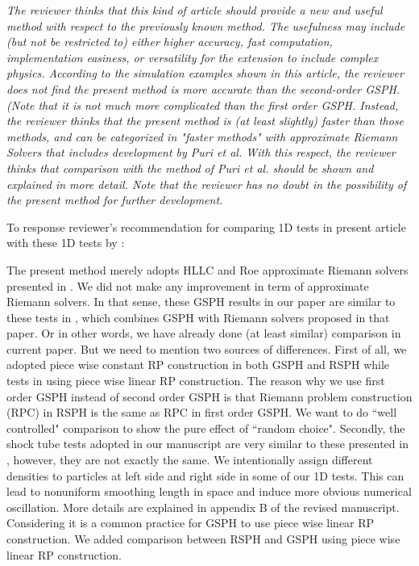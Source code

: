 \documentclass[10pt,a4paper]{article}
\begin{document}
\textit{The reviewer thinks that this kind of article should provide a new and useful method with respect to the previously known method. The usefulness may include (but not be restricted to) either higher accuracy, fast computation, implementation easiness, or versatility for the extension to include complex physics. According to the simulation examples shown in this article, the reviewer does not find the present method is more accurate than the second-order GSPH. (Note that it is not much more complicated than the first order GSPH. Instead, the reviewer thinks that the present method is (at least slightly) faster than those methods, and can be categorized in "faster methods" with approximate Riemann Solvers that includes development by Puri et al. With this respect, the reviewer thinks that comparison with the method of Puri et al. should be shown and explained in more detail. Note that the reviewer has no doubt in the
possibility of the present method for further development.}

To response reviewer's recommendation for comparing 1D tests in present article with these 1D tests by \citet{puri2014approximate}:

The present method merely adopts HLLC and Roe approximate Riemann solvers presented in \citep{puri2014approximate}. We did not make any improvement in term of approximate Riemann solvers. In that sense, these GSPH results in our paper are similar to these tests in \citep{puri2014approximate}, which combines GSPH with Riemann solvers proposed in that paper. Or in other words, we have already done (at least similar) comparison in current paper.
But we need to mention two sources of differences. First of all, we adopted piece wise constant RP construction in both GSPH and RSPH while tests in \citep{puri2014approximate} using piece wise linear RP construction. The reason why we use first order GSPH instead of second order GSPH is that Riemann problem construction (RPC) in RSPH is the same as RPC in first order GSPH. We want to do ``well controlled" comparison to show the pure effect of ``random choice". Secondly, the shock tube tests adopted in our manuscript are very similar to these presented in \citep{puri2014approximate}, however, they are not exactly the same. We intentionally assign different densities to particles at left side and right side in some of our 1D tests. This can lead to nonuniform smoothing length in space and induce more obvious numerical oscillation. More details are explained in appendix B of the revised manuscript.
Considering it is a common practice for GSPH to use piece wise linear RP construction.
We added comparison between RSPH and GSPH using  piece wise linear RP construction.
\end{document}
